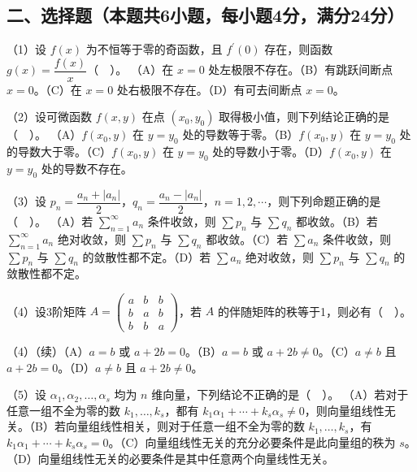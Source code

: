 \documentclass[UTF8,12pt]{ctexart}
\begin{document}
\subsection*{二、选择题（本题共6小题，每小题4分，满分24分）}

（1）设 \(\displaystyle f(x)\) 为不恒等于零的奇函数，且 \(\displaystyle f^{\prime}(0)\) 存在，则函数 \(\displaystyle g(x)=\dfrac{\displaystyle f(x)}{\displaystyle x}\)（　）。
（A）在 \(\displaystyle x=0\) 处左极限不存在。（B）有跳跃间断点 \(\displaystyle x=0\)。（C）在 \(\displaystyle x=0\) 处右极限不存在。（D）有可去间断点 \(\displaystyle x=0\)。


（2）设可微函数 \(\displaystyle f(x,\allowbreak y)\) 在点 \(\displaystyle (x_0,\allowbreak y_0)\) 取得极小值，则下列结论正确的是（　）。
（A）\(\displaystyle f(x_0,\allowbreak y)\) 在 \(\displaystyle y=y_0\) 处的导数等于零。（B）\(\displaystyle f(x_0,\allowbreak y)\) 在 \(\displaystyle y=y_0\) 处的导数大于零。（C）\(\displaystyle f(x_0,\allowbreak y)\) 在 \(\displaystyle y=y_0\) 处的导数小于零。（D）\(\displaystyle f(x_0,\allowbreak y)\) 在 \(\displaystyle y=y_0\) 处的导数不存在。


（3）设 \(\displaystyle p_n=\dfrac{\displaystyle a_n+|a_n|}{\displaystyle 2}\)，\(\displaystyle q_n=\dfrac{\displaystyle a_n-|a_n|}{\displaystyle 2}\)，\(\displaystyle n=1,\allowbreak 2,\allowbreak \cdots\)，则下列命题正确的是（　）。
（A）若 \(\displaystyle \sum_{n=1}^{\infty}a_n\) 条件收敛，则 \(\displaystyle \sum p_n\) 与 \(\displaystyle \sum q_n\) 都收敛。（B）若 \(\displaystyle \sum_{n=1}^{\infty}a_n\) 绝对收敛，则 \(\displaystyle \sum p_n\) 与 \(\displaystyle \sum q_n\) 都收敛。（C）若 \(\displaystyle \sum a_n\) 条件收敛，则 \(\displaystyle \sum p_n\) 与 \(\displaystyle \sum q_n\) 的敛散性都不定。（D）若 \(\displaystyle \sum a_n\) 绝对收敛，则 \(\displaystyle \sum p_n\) 与 \(\displaystyle \sum q_n\) 的敛散性都不定。


（4）设3阶矩阵 \(\displaystyle A=\begin{pmatrix}a&b&b\\b&a&b\\b&b&a\end{pmatrix}\)，若 \(\displaystyle A\) 的伴随矩阵的秩等于1，则必有（　）。


（4）（续）（A）\(\displaystyle a=b\) 或 \(\displaystyle a+2b=0\)。（B）\(\displaystyle a=b\) 或 \(\displaystyle a+2b\ne0\)。（C）\(\displaystyle a\ne b\) 且 \(\displaystyle a+2b=0\)。（D）\(\displaystyle a\ne b\) 且 \(\displaystyle a+2b\ne0\)。


（5）设 \(\displaystyle \alpha_1,\allowbreak \alpha_2,\allowbreak \ldots,\allowbreak \alpha_s\) 均为 \(\displaystyle n\) 维向量，下列结论不正确的是（　）。
（A）若对于任意一组不全为零的数 \(\displaystyle k_1,\allowbreak \ldots,\allowbreak k_s\)，都有 \(\displaystyle k_1\alpha_1+\cdots+k_s\alpha_s\ne0\)，则向量组线性无关。（B）若向量组线性相关，则对于任意一组不全为零的数 \(\displaystyle k_1,\allowbreak \ldots,\allowbreak k_s\)，有 \(\displaystyle k_1\alpha_1+\cdots+k_s\alpha_s=0\)。（C）向量组线性无关的充分必要条件是此向量组的秩为 \(\displaystyle s\)。（D）向量组线性无关的必要条件是其中任意两个向量线性无关。
\end{document}
